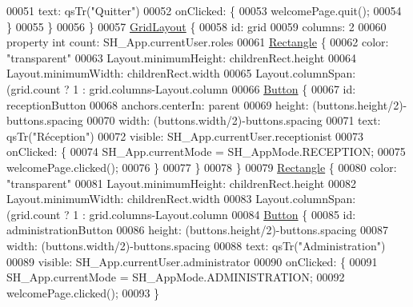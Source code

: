 \begin{DoxyCode}
00051                 text: qsTr(\textcolor{stringliteral}{"Quitter"})
00052                 onClicked: \{
00053                     welcomePage.quit();
00054                 \}
00055             \}
00056         \}
00057         \hyperlink{classGridLayout}{GridLayout} \{
00058             \textcolor{keywordtype}{id}: grid
00059             columns: 2
00060             \textcolor{keyword}{property} \textcolor{keywordtype}{int} count: SH\_App.currentUser.roles
00061             \hyperlink{classRectangle}{Rectangle} \{
00062                 color: \textcolor{stringliteral}{"transparent"}
00063                 Layout.minimumHeight: childrenRect.height
00064                 Layout.minimumWidth: childrenRect.width
00065                 Layout.columnSpan: (grid.count%
      ? 1 : grid.columns-Layout.column
00066                 \hyperlink{classButton}{Button} \{
00067                     \textcolor{keywordtype}{id}: receptionButton
00068                     anchors.centerIn: parent
00069                     height: (buttons.height/2)-buttons.spacing
00070                     width: (buttons.width/2)-buttons.spacing
00071                     text: qsTr(\textcolor{stringliteral}{"Réception"})
00072                     visible: SH\_App.currentUser.receptionist
00073                     onClicked: \{
00074                         SH\_App.currentMode = SH\_AppMode.RECEPTION;
00075                         welcomePage.clicked();
00076                     \}
00077                 \}
00078             \}
00079             \hyperlink{classRectangle}{Rectangle} \{
00080                 color: \textcolor{stringliteral}{"transparent"}
00081                 Layout.minimumHeight: childrenRect.height
00082                 Layout.minimumWidth: childrenRect.width
00083                 Layout.columnSpan: (grid.count%
      ? 1 : grid.columns-Layout.column
00084                 \hyperlink{classButton}{Button} \{
00085                     \textcolor{keywordtype}{id}: administrationButton
00086                     height: (buttons.height/2)-buttons.spacing
00087                     width: (buttons.width/2)-buttons.spacing
00088                     text: qsTr(\textcolor{stringliteral}{"Administration"})
00089                     visible: SH\_App.currentUser.administrator
00090                     onClicked: \{
00091                         SH\_App.currentMode = SH\_AppMode.ADMINISTRATION;
00092                         welcomePage.clicked();
00093                     \}

\end{DoxyCode}

